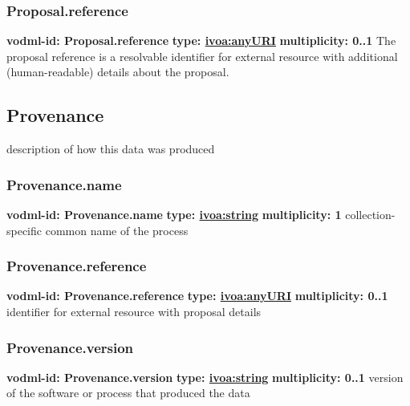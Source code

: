     \subsubsection{Proposal.reference}
      \textbf{vodml-id: Proposal.reference} \newline
      \textbf{type: \hyperref[sect:ivoa]{ivoa:anyURI}} \newline
      \textbf{multiplicity: 0..1} \newline
      The proposal reference is a resolvable identifier for external resource with additional (human-readable) details about the proposal.

  \subsection{Provenance}
  \label{sect:Provenance}
    description of how this data was produced

    \subsubsection{Provenance.name}
      \textbf{vodml-id: Provenance.name} \newline
      \textbf{type: \hyperref[sect:ivoa]{ivoa:string}} \newline
      \textbf{multiplicity: 1} \newline
      collection-specific common name of the process

    \subsubsection{Provenance.reference}
      \textbf{vodml-id: Provenance.reference} \newline
      \textbf{type: \hyperref[sect:ivoa]{ivoa:anyURI}} \newline
      \textbf{multiplicity: 0..1} \newline
      identifier for external resource with proposal details

    \subsubsection{Provenance.version}
      \textbf{vodml-id: Provenance.version} \newline
      \textbf{type: \hyperref[sect:ivoa]{ivoa:string}} \newline
      \textbf{multiplicity: 0..1} \newline
      version of the software or process that produced the data

